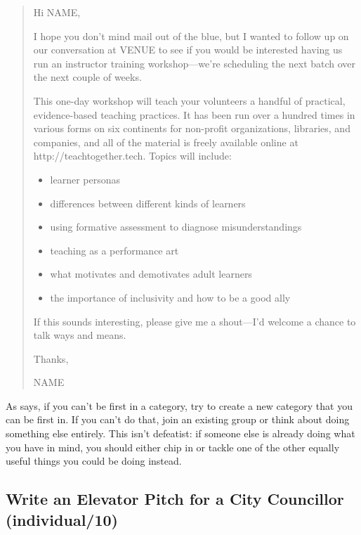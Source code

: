 \begin{quote}

  \noindent
  Hi NAME,

  I hope you don't mind mail out of the blue,
  but I wanted to follow up on our conversation at VENUE
  to see if you would be interested having us run an instructor training workshop---we're
  scheduling the next batch over the next couple of weeks.

  This one-day workshop will teach your volunteers
  a handful of practical, evidence-based teaching practices.
  It has been run over a hundred times in various forms on six continents
  for non-profit organizations, libraries, and companies,
  and all of the material is freely available online at http://teachtogether.tech.
  Topics will include:

  \begin{itemize}
  \item learner personas
  \item differences between different kinds of learners
  \item using formative assessment to diagnose misunderstandings
  \item teaching as a performance art
  \item what motivates and demotivates adult learners
  \item the importance of inclusivity and how to be a good ally
  \end{itemize}
  
  If this sounds interesting,
  please give me a shout---I'd welcome a chance to talk ways and means.

  Thanks,

  NAME

\end{quote}


As \cite{Kuch2011} says,
if you can't be first in a category,
try to create a new category that you can be first in.
If you can't do that,
join an existing group or think about doing something else entirely.
This isn't defeatist:
if someone else is already doing what you have in mind,
you should either chip in or tackle one of the other equally useful things
you could be doing instead.


\subsection*{Write an Elevator Pitch for a City Councillor (individual/10)}

